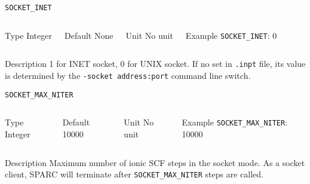 \begin{frame}[allowframebreaks]{\texttt{SOCKET\_INET}} \label{SOCKET_INET}
\vspace*{-12pt}
\begin{columns}
\begin{block}{Type}
Integer
\end{block}

\begin{block}{Default}
None
\end{block}

\begin{block}{Unit}
No unit
\end{block}

\begin{block}{Example}
\texttt{SOCKET\_INET}: 0
\end{block}
\end{columns}

\begin{block}{Description}
  1 for INET socket, 0 for UNIX socket. If no set in \texttt{.inpt}
  file, its value is determined by the \texttt{-socket address:port}
  command line switch.
\end{block}

\end{frame}

\begin{frame}[allowframebreaks]{\texttt{SOCKET\_MAX\_NITER}} \label{SOCKET_MAX_NITER}
\vspace*{-12pt}
\begin{columns}
\begin{block}{Type}
Integer
\end{block}

\begin{block}{Default}
10000
\end{block}

\begin{block}{Unit}
No unit
\end{block}

\begin{block}{Example}
\texttt{SOCKET\_MAX\_NITER}: 10000
\end{block}
\end{columns}

\begin{block}{Description}
  Maximum number of ionic SCF steps in the socket mode. As a socket
  client, SPARC will terminate after \texttt{SOCKET\_MAX\_NITER} steps
  are called.
\end{block}


\end{frame}
